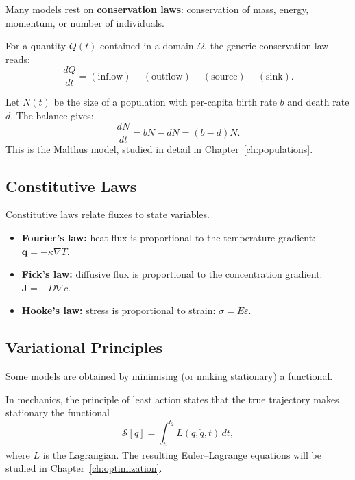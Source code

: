 Many models rest on \textbf{conservation laws}: conservation of mass,
energy, momentum, or number of individuals.

\begin{theorem}
For a quantity $Q(t)$ contained in a domain $\Omega$, the generic
conservation law reads:
\[
  \frac{dQ}{dt} = (\text{inflow}) - (\text{outflow})
                 + (\text{source}) - (\text{sink}).
\]
\end{theorem}

\begin{example}
Let $N(t)$ be the size of a population with per-capita birth rate $b$
and death rate $d$.  The balance gives:
\[
  \frac{dN}{dt} = bN - dN = (b-d)N.
\]
This is the Malthus model, studied in detail in
Chapter~\ref{ch:populations}.
\end{example}

\subsection{Constitutive Laws}

Constitutive laws relate fluxes to state variables.

\begin{example}
\begin{itemize}
  \item \textbf{Fourier's law:} heat flux is proportional to the
    temperature gradient: $\mathbf{q}=-\kappa\nabla T$.
  \item \textbf{Fick's law:} diffusive flux is proportional to the
    concentration gradient: $\mathbf{J}=-D\nabla c$.
  \item \textbf{Hooke's law:} stress is proportional to strain:
    $\sigma = E\varepsilon$.
\end{itemize}
\end{example}

\subsection{Variational Principles}

Some models are obtained by minimising (or making stationary) a functional.

\begin{definition}
In mechanics, the principle of least action states that the true
trajectory makes stationary the functional
\[
  \mathcal{S}[q] = \int_{t_1}^{t_2} L(q,\dot{q},t)\,dt,
\]
where $L$ is the Lagrangian.  The resulting Euler--Lagrange equations
will be studied in Chapter~\ref{ch:optimization}.
\end{definition}

